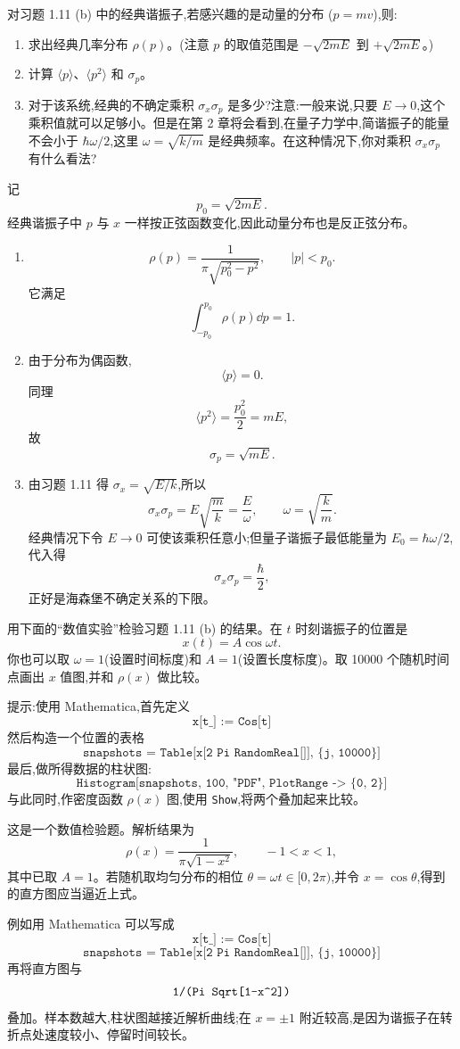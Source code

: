 \begin{question}
对习题 1.11 (b) 中的经典谐振子,若感兴趣的是动量的分布 ($p=mv$),则:
\begin{enumerate}
\item 求出经典几率分布 $\rho(p)$。(注意 $p$ 的取值范围是 $-\sqrt{2mE}$ 到 $+\sqrt{2mE}$。)
\item 计算 $\langle p\rangle$、$\langle p^2\rangle$ 和 $\sigma_p$。
\item 对于该系统,经典的不确定乘积 $\sigma_x\sigma_p$ 是多少?注意:一般来说,只要 $E\to0$,这个乘积值就可以足够小。但是在第 2 章将会看到,在量子力学中,简谐振子的能量不会小于 $\hbar\omega/2$,这里 $\omega=\sqrt{k/m}$ 是经典频率。在这种情况下,你对乘积 $\sigma_x\sigma_p$ 有什么看法?
\end{enumerate}
\begin{solution}
记
\[
p_0=\sqrt{2mE}.
\]
经典谐振子中 $p$ 与 $x$ 一样按正弦函数变化,因此动量分布也是反正弦分布。
\begin{enumerate}
\item
\[
\rho(p)=\frac{1}{\pi\sqrt{p_0^2-p^2}},\qquad |p|<p_0.
\]
它满足
\[
\int_{-p_0}^{p_0}\rho(p)\dd p=1.
\]
\item 由于分布为偶函数,
\[
\langle p\rangle=0.
\]
同理
\[
\langle p^2\rangle=\frac{p_0^2}{2}=mE,
\]
故
\[
\sigma_p=\sqrt{mE}.
\]
\item 由习题 1.11 得 $\sigma_x=\sqrt{E/k}$,所以
\[
\sigma_x\sigma_p=E\sqrt{\frac{m}{k}}=\frac{E}{\omega},
\qquad \omega=\sqrt{\frac{k}{m}}.
\]
经典情况下令 $E\to0$ 可使该乘积任意小;但量子谐振子最低能量为 $E_0=\hbar\omega/2$,代入得
\[
\sigma_x\sigma_p=\frac{\hbar}{2},
\]
正好是海森堡不确定关系的下限。
\end{enumerate}
\end{solution}
\end{question}

\begin{question}
用下面的“数值实验”检验习题 1.11 (b) 的结果。在 $t$ 时刻谐振子的位置是
\[
x(t)=A\cos\omega t.
\tag{1.44}
\]
你也可以取 $\omega=1$(设置时间标度)和 $A=1$(设置长度标度)。取 10000 个随机时间点画出 $x$ 值图,并和 $\rho(x)$ 做比较。

提示:使用 Mathematica,首先定义
\[
\texttt{x[t\_] := Cos[t]}
\]
然后构造一个位置的表格
\[
\texttt{snapshots = Table[x[2 Pi RandomReal[]], \{j, 10000\}]}
\]
最后,做所得数据的柱状图:
\[
\texttt{Histogram[snapshots, 100, "PDF", PlotRange -> \{0, 2\}]}
\]
与此同时,作密度函数 $\rho(x)$ 图,使用 \texttt{Show},将两个叠加起来比较。
\begin{solution}
这是一个数值检验题。解析结果为
\[
\rho(x)=\frac{1}{\pi\sqrt{1-x^2}},\qquad -1<x<1,
\]
其中已取 $A=1$。若随机取均匀分布的相位 $\theta=\omega t\in[0,2\pi)$,并令 $x=\cos\theta$,得到的直方图应当逼近上式。

例如用 Mathematica 可以写成
\[
\texttt{x[t\_] := Cos[t]}
\]
\[
\texttt{snapshots = Table[x[2 Pi RandomReal[]], \{j, 10000\}]}
\]
再将直方图与
\[
\texttt{1/(Pi Sqrt[1-x\string^2])}
\]
叠加。样本数越大,柱状图越接近解析曲线;在 $x=\pm1$ 附近较高,是因为谐振子在转折点处速度较小、停留时间较长。
\end{solution}
\end{question}

